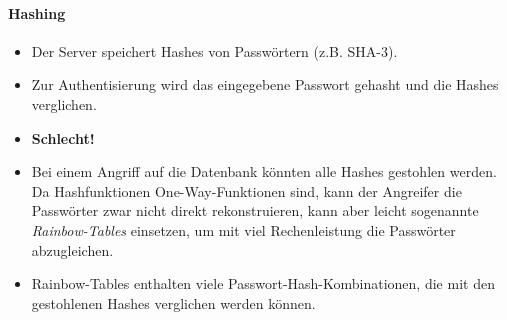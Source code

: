 \documentclass[a4paper, 11pt, accentcolor = tud3b]{tudreport}
\begin{document}
                \paragraph{Hashing}
                    \begin{itemize}
                    	\item Der Server speichert Hashes von Passwörtern (z.B. SHA-3).
                    	\item Zur Authentisierung wird das eingegebene Passwort gehasht und die Hashes verglichen.
                    	\item \textbf{Schlecht!}
                    	\item Bei einem Angriff auf die Datenbank könnten alle Hashes gestohlen werden. Da Hashfunktionen One-Way-Funktionen sind, kann der Angreifer die Passwörter zwar nicht direkt rekonstruieren, kann aber leicht sogenannte \textit{Rainbow-Tables} einsetzen, um mit viel Rechenleistung die Passwörter abzugleichen.
                    	\item Rainbow-Tables enthalten viele Passwort-Hash-Kombinationen, die mit den gestohlenen Hashes verglichen werden können.
                    \end{itemize}
\end{document}
